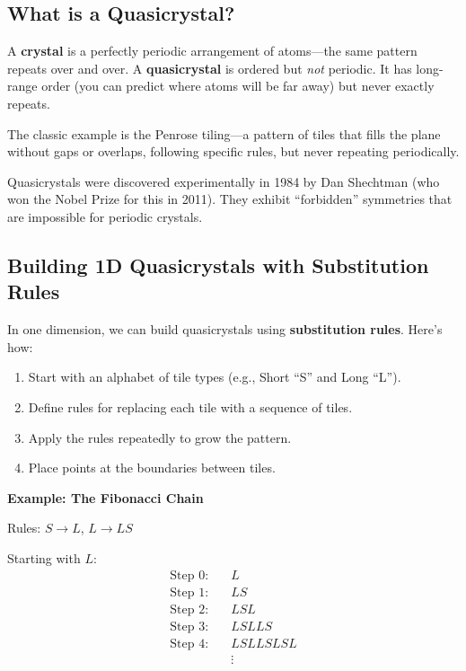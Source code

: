 \documentclass[11pt,letterpaper]{article}
\begin{document}
\subsection{What is a Quasicrystal?}

A \textbf{crystal} is a perfectly periodic arrangement of atoms---the same pattern repeats over and over. A \textbf{quasicrystal} is ordered but \textit{not} periodic. It has long-range order (you can predict where atoms will be far away) but never exactly repeats.

The classic example is the Penrose tiling---a pattern of tiles that fills the plane without gaps or overlaps, following specific rules, but never repeating periodically.

Quasicrystals were discovered experimentally in 1984 by Dan Shechtman (who won the Nobel Prize for this in 2011). They exhibit ``forbidden'' symmetries that are impossible for periodic crystals.

\subsection{Building 1D Quasicrystals with Substitution Rules}

In one dimension, we can build quasicrystals using \textbf{substitution rules}. Here's how:

\begin{enumerate}
    \item Start with an alphabet of tile types (e.g., Short ``S'' and Long ``L'').
    \item Define rules for replacing each tile with a sequence of tiles.
    \item Apply the rules repeatedly to grow the pattern.
    \item Place points at the boundaries between tiles.
\end{enumerate}

\textbf{Example: The Fibonacci Chain}

Rules: $S \to L$, $L \to LS$

Starting with $L$:
\begin{align*}
\text{Step 0:} &\quad L \\
\text{Step 1:} &\quad LS \\
\text{Step 2:} &\quad LSL \\
\text{Step 3:} &\quad LSLLS \\
\text{Step 4:} &\quad LSLLSLSL \\
&\quad \vdots
\end{align*}
\end{document}
